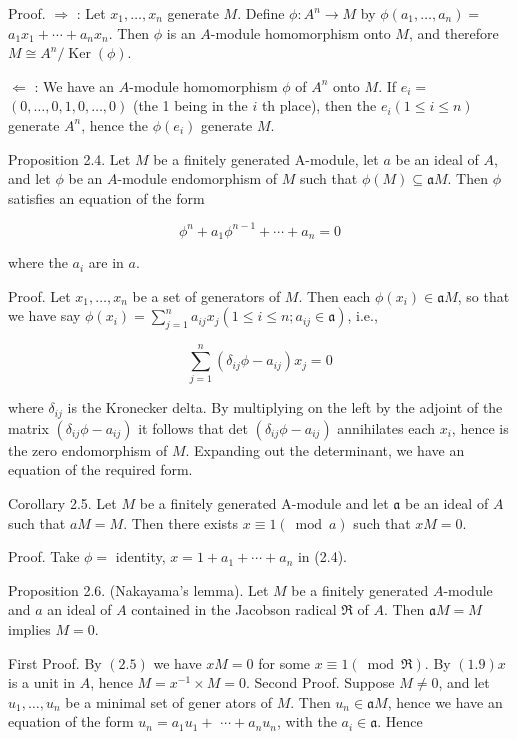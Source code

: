 \documentclass{standalone}
\theoremstyle{definition}
\theoremstyle{remark}
\begin{document}
Proof. $\Rightarrow$ : Let $x_{1}, \ldots, x_{n}$ generate $M$. Define $\phi: A^{n} \rightarrow M$ by $\phi\left(a_{1}, \ldots, a_{n}\right)=$ $a_{1} x_{1}+\cdots+a_{n} x_{n}$. Then $\phi$ is an $A$-module homomorphism onto $M$, and therefore $M \cong A^{n} / \operatorname{Ker}(\phi)$.

$\Leftarrow$ : We have an $A$-module homomorphism $\phi$ of $A^{n}$ onto $M$. If $e_{i}=$ $(0, \ldots, 0,1,0, \ldots, 0)$ (the 1 being in the $i$ th place), then the $e_{i}(1 \leqslant i \leqslant n)$ generate $A^{n}$, hence the $\phi\left(e_{i}\right)$ generate $M$.

Proposition 2.4. Let $M$ be a finitely generated A-module, let $a$ be an ideal of $A$, and let $\phi$ be an $A$-module endomorphism of $M$ such that $\phi(M) \subseteq \mathfrak{a} M$. Then $\phi$ satisfies an equation of the form

\[
\phi^{n}+a_{1} \phi^{n-1}+\cdots+a_{n}=0
\]

where the $a_{i}$ are in $a$.

Proof. Let $x_{1}, \ldots, x_{n}$ be a set of generators of $M$. Then each $\phi\left(x_{i}\right) \in \mathfrak{a} M$, so that we have say $\phi\left(x_{i}\right)=\sum_{j=1}^{n} a_{i j} x_{j}\left(1 \leqslant i \leqslant n ; a_{i j} \in \mathfrak{a}\right)$, i.e.,

\[
\sum_{j=1}^{n}\left(\delta_{i j} \phi-a_{i j}\right) x_{j}=0
\]

where $\delta_{i j}$ is the Kronecker delta. By multiplying on the left by the adjoint of the matrix $\left(\delta_{i j} \phi-a_{i j}\right)$ it follows that det $\left(\delta_{i j} \phi-a_{i j}\right)$ annihilates each $x_{i}$, hence is the zero endomorphism of $M$. Expanding out the determinant, we have an equation of the required form.

Corollary 2.5. Let $M$ be a finitely generated A-module and let $\mathfrak{a}$ be an ideal of $A$ such that $a M=M$. Then there exists $x \equiv 1(\bmod a)$ such that $x M=0$.

Proof. Take $\phi=$ identity, $x=1+a_{1}+\cdots+a_{n}$ in (2.4).

Proposition 2.6. (Nakayama's lemma). Let $M$ be a finitely generated $A$-module and $a$ an ideal of $A$ contained in the Jacobson radical $\Re$ of $A$. Then $\mathfrak{a} M=M$ implies $M=0$.

First Proof. By $(2.5)$ we have $x M=0$ for some $x \equiv 1(\bmod \Re)$. By $(1.9) x$ is a unit in $A$, hence $M=x^{-1} \times M=0$. Second Proof. Suppose $M \neq 0$, and let $u_{1}, \ldots, u_{n}$ be a minimal set of gener ators of $M$. Then $u_{n} \in \mathfrak{a} M$, hence we have an equation of the form $u_{n}=a_{1} u_{1}+$ $\cdots+a_{n} u_{n}$, with the $a_{i} \in \mathfrak{a}$. Hence
\end{document}
